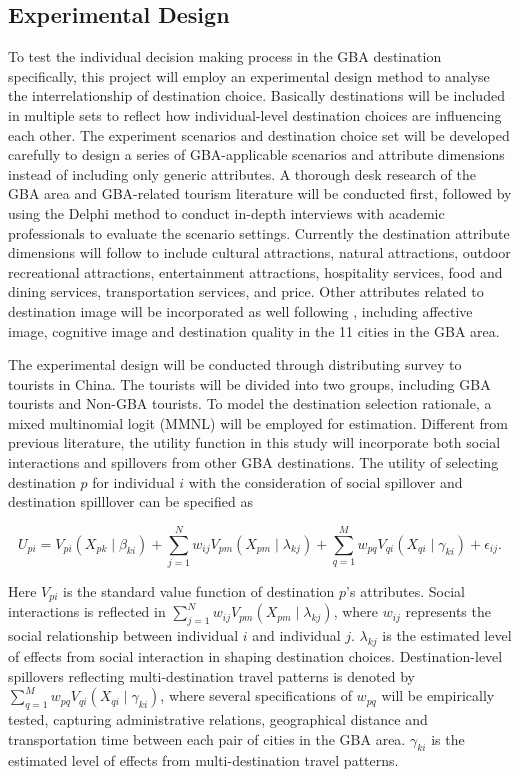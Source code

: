 \documentclass[11pt,a4paper]{amsart}
\theoremstyle{plain}
\theoremstyle{definition}
\begin{document}
\subsection{Experimental Design}\hfill\par 
\noindent To test the individual decision making process in the GBA destination specifically, this project will employ an experimental design method to analyse the interrelationship of destination choice. Basically destinations will be included in multiple sets to reflect how individual-level destination choices are influencing each other. The experiment scenarios and destination choice set will be developed carefully to design a series of GBA-applicable scenarios and attribute dimensions instead of including only generic attributes. A thorough desk research of the GBA area and GBA-related tourism literature will be conducted first, followed by using the Delphi method to conduct in-depth interviews with academic professionals to evaluate the scenario settings. Currently the destination attribute dimensions will follow \textcite{masieroModelingReferenceExperience2018} to include cultural attractions, natural attractions, outdoor recreational attractions, entertainment attractions, hospitality services, food and dining services, transportation services, and price. Other attributes related to destination image will be incorporated as well following \textcite{kirillovaDevelopingCoopetitiveDestination2020}, including affective image, cognitive image and destination quality in the 11 cities in the GBA area. 

\noindent The experimental design will be conducted through distributing survey to tourists in China. The tourists will be divided into two groups, including GBA tourists and Non-GBA tourists. To model the destination selection rationale, a mixed multinomial logit (MMNL) will be employed for estimation. Different from previous literature, the utility function in this study will incorporate both social interactions and spillovers from other GBA destinations. The utility of selecting destination $p$ for individual $i$ with the consideration of social spillover and destination spilllover can be specified as 

\[	U_{pi} = V_{pi}(X_{pk} \mid \beta_{ki}) + \sum_{j = 1}^{N} w_{ij}V_{pm}(X_{pm}\mid \lambda_{kj}) + \sum_{q = 1}^{M}w_{pq}V_{qi}(X_{qi}\mid\gamma_{ki}) + \epsilon_{ij}.	\]

\noindent Here $V_{pi}$ is the standard value function of destination $p$’s attributes. Social interactions is reflected in $ \sum_{j = 1}^{N} w_{ij}V_{pm}(X_{pm}\mid \lambda_{kj})$, where $w_{ij}$ represents the social relationship between individual $i$ and individual $j$. $\lambda_{kj}$ is the estimated level of effects from social interaction in shaping destination choices. Destination-level spillovers reflecting multi-destination travel patterns is denoted by $\sum_{q = 1}^{M}w_{pq}V_{qi}(X_{qi}\mid\gamma_{ki})$, where several specifications of $w_{pq}$ will be empirically tested, capturing administrative relations, geographical distance and transportation time between each pair of cities in the GBA area. $\gamma_{ki}$ is the estimated level of effects from multi-destination travel patterns.
\end{document}
